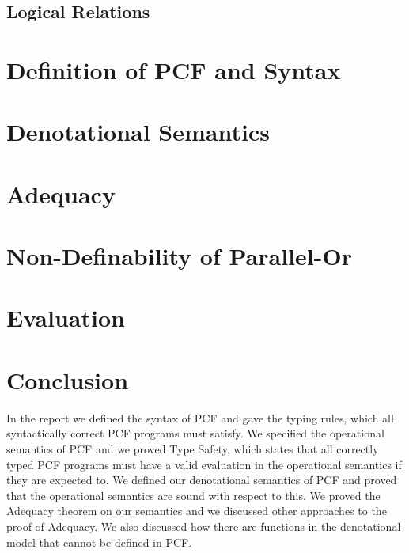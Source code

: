 \documentclass{bhamthesis}
\begin{document}


\section{Logical Relations}\label{log}



\chapter{Definition of PCF and Syntax}\label{ch3}




\chapter{Denotational Semantics}\label{ch6}


\chapter{Adequacy}\label{Adequacy}

%






\chapter{Non-Definability of Parallel-Or}\label{por}



\chapter{Evaluation}\label{ch9}



\chapter{Conclusion}\label{ch10}
In the report we defined the syntax of PCF and gave the typing rules, which all syntactically correct PCF programs must satisfy. We specified the operational semantics of PCF and we proved Type Safety, which states that all correctly typed PCF programs must have a valid evaluation in the operational semantics if they are expected to.
We defined our denotational semantics of PCF and proved that the operational semantics are sound with respect to this. We proved the Adequacy theorem on our semantics and we discussed other approaches to the proof of Adequacy. We also discussed how there are functions in the denotational model that cannot be defined in PCF.




\end{document}
